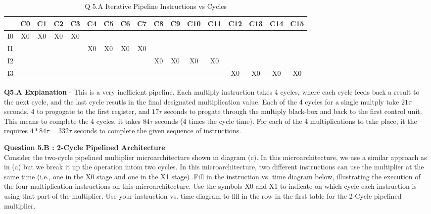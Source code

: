 \documentclass[a4paper,11pt]{article}
\begin{document}
\begin{table}[H]
\caption{Q 5.A Iterative Pipeline Instructions vs Cycles}
\begin{center}
\begin{tabular}{|c|c|c|c|c|c|c|c|c|c|c|c|c|c|c|c|c|} \hline
     & C0 & C1 & C2 & C3 & C4 & C5 & C6 & C7 & C8 & C9 & C10 & C11 & C12 & C13 & C14 & C15  \\ \hline
  I0 & X0 & X0 & X0 & X0 &    &    &    &    &    &     &     &     &     &     &    &      \\ \hline   
  I1 &    &    &    &    & X0 & X0 & X0 & X0 &    &     &     &     &     &     &    &      \\ \hline   
  I2 &    &    &    &    &    &    &    &    & X0 & X0  &  X0 & X0  &     &     &    &      \\ \hline   
  I3 &    &    &    &    &    &    &    &    &    &     &     &     & X0  &  X0 & X0 & X0   \\ \hline   
\end{tabular}
\end{center}
\end{table}

\textbf{Q5.A Explanation} - This is a very inefficient pipeline. Each multiply instruction takes 4 cycles, where each cycle feeds back a result to the next cycle, and the last cycle resutls in the final designated multiplication value. Each of the 4 cycles for a single multply take $21\tau$ seconds, 4 to progogate to the first register, and $17\tau$ seconds to progate through the multiply black-box and back to the first control unit. This means to complete the 4 cycles, it takes $84\tau$ seconds (4 times the cycle time). For each of the 4 multiplications to take place, it the requires $4*84\tau = 332\tau$ seconds to complete the given sequence of instructions.

\item \textbf{Question 5.B : 2-Cycle Pipelined Architecture} \\
  Consider the two-cycle pipelined multiplier microarchitecture shown in diagram (c). In this microarchitecture, we use a similar approach as in (a) but we break it up the operation intom two cycles. In this microarchitecture, two different instructions can use the multiplier at the same time (i.e., one in the X0 stage and one in the X1 stage) .Fill in the instruction vs. time diagram below, illustrating the execution of the four multiplication  instructions on this microarchitecture. Use the symbols X0 and X1 to indicate on which cycle each instruction is using that part of the multiplier. Use your instruction vs. time diagram to fill in the row in the first table for the 2-Cycle pipelined multiplier. \\
\end{document}
